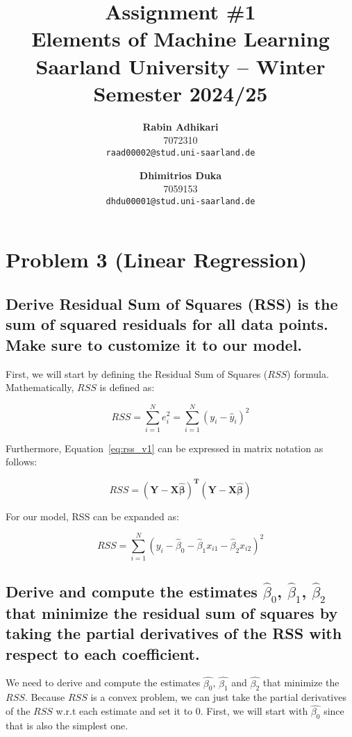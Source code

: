 \documentclass{article}
\title{Assignment \#1\\
  \vspace{2mm}
  \small{Elements of Machine Learning}
  \\
  \vspace{2mm}
  \small{Saarland University -- Winter Semester 2024/25}
}
\author{%
\textbf{Rabin Adhikari} \\
  7072310 \\
  \texttt{raad00002@stud.uni-saarland.de} \\
  \and
  \textbf{Dhimitrios Duka} \\
 7059153 \\
  \texttt{dhdu00001@stud.uni-saarland.de} \\
}
\begin{document}
\maketitle

\section*{Problem 3 (Linear Regression)}
\subsection*{Derive Residual Sum of Squares (RSS) is the sum of squared residuals for all data points. Make sure to customize it to our model.}
First, we will start by defining the Residual Sum of Squares ($RSS$) formula. Mathematically, $RSS$ is defined as:

\begin{equation}
  RSS = \sum_{i=1}^N e_i^2 = \sum_{i=1}^N (y_i - \hat{y}_i)^2
  \label{eq:rss_v1}
\end{equation}

Furthermore, Equation~\ref{eq:rss_v1} can be expressed in matrix notation as follows:

\begin{equation}
  RSS = \mathbf{(Y - X \boldsymbol{\hat{\beta}})^T (Y - X\boldsymbol{\hat{\beta}})}
\end{equation}

For our model, RSS can be expanded as:

\begin{equation}
    \label{eqn:rss}
    RSS = \sum_{i=1}^N \left( y_i - \hat{\beta}_0 - \hat{\beta}_1x_{i1} - \hat{\beta}_2x_{i2} \right)^2
\end{equation}

\subsection*{Derive and compute the estimates $\hat{\beta}_0$, $\hat{\beta}_1$, $\hat{\beta}_2$ that minimize the residual sum of squares by taking the partial derivatives of the RSS with respect to each coefficient.}

We need to derive and compute the estimates $\hat{\beta_0}$, $\hat{\beta_1}$ and $\hat{\beta_2}$ that minimize the $RSS$. Because $RSS$ is a convex problem, we can just take the partial derivatives of the $RSS$ w.r.t each estimate and set it to $0$. First, we will start with $\hat{\beta_0}$ since that is also the simplest one.
\end{document}
